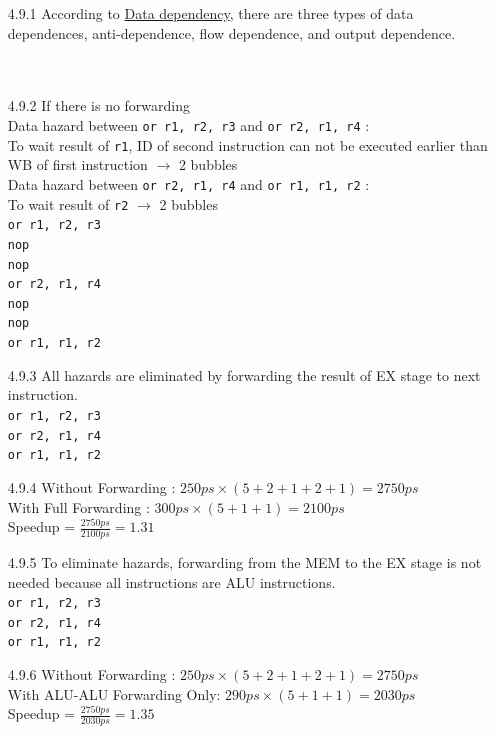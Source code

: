 \documentclass[12pt, a4paper]{article}
\begin{document}
\begin{itemize}[font=\bfseries]
\item[4.9.1]
According to \href{https://en.wikipedia.org/wiki/Data_dependency}{Data dependency}, there are three types of data dependences, anti-dependence, flow dependence, and output dependence. \\
 \\
 \\
\item[4.9.2] If there is no forwarding \\ 
Data hazard between \texttt{or r1, r2, r3} and \texttt{or r2, r1, r4} : \\ To wait result of \texttt{r1}, ID of second instruction can not be executed earlier than WB of first instruction $\rightarrow$ 2 bubbles \\
Data hazard between \texttt{or r2, r1, r4} and \texttt{or r1, r1, r2} : \\ To wait result of \texttt{r2} $\rightarrow$ 2 bubbles \\
\newpage
\texttt{or r1, r2, r3} \\
\texttt{nop} \\
\texttt{nop} \\
\texttt{or r2, r1, r4} \\
\texttt{nop} \\
\texttt{nop} \\
\texttt{or r1, r1, r2} \\
\item[4.9.3]
All hazards are eliminated by forwarding the result of EX stage to next instruction. \\
\texttt{or r1, r2, r3} \\
\texttt{or r2, r1, r4} \\
\texttt{or r1, r1, r2} \\
\item[4.9.4]
Without Forwarding : $250ps \times (5 + 2 + 1 + 2 + 1) = 2750ps$ \\
With Full Forwarding : $300ps \times (5 + 1 + 1) = 2100ps$ \\
Speedup = $\displaystyle \frac{2750ps}{2100ps} = 1.31$ 
\item[4.9.5]
To eliminate hazards, forwarding from the MEM to the EX stage is not needed because all instructions are ALU instructions. \\
\texttt{or r1, r2, r3} \\
\texttt{or r2, r1, r4} \\
\texttt{or r1, r1, r2} \\
\item[4.9.6]
Without Forwarding : $250ps \times (5 + 2 + 1 + 2 + 1) = 2750ps$ \\
With ALU-ALU Forwarding Only: $290ps \times (5 + 1 + 1) = 2030ps$ \\
Speedup = $\displaystyle \frac{2750ps}{2030ps} = 1.35$ 


\end{itemize}
\end{document}
